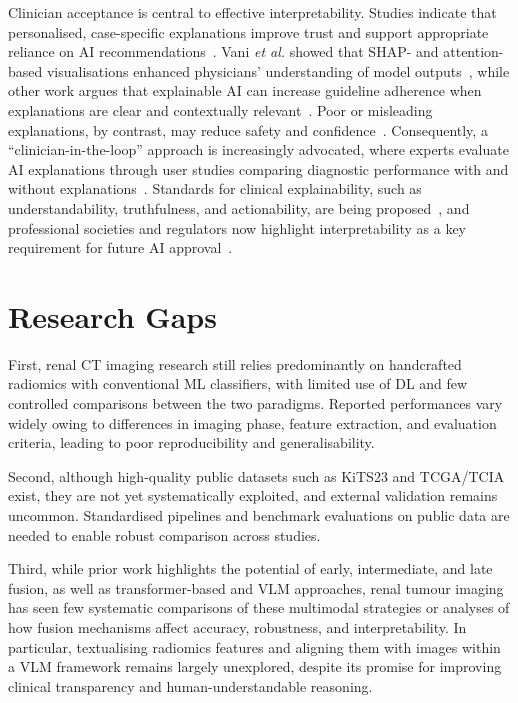 \documentclass[final,british,a4paper,12pt]{phdthesis}
\begin{document}
Clinician acceptance is central to effective interpretability. Studies indicate that personalised, case-specific explanations improve trust and support appropriate reliance on AI recommendations~\cite{vani2025personalized}. Vani \textit{et al.} showed that SHAP- and attention-based visualisations enhanced physicians’ understanding of model outputs~\cite{vani2025personalized}, while other work argues that explainable AI can increase guideline adherence when explanations are clear and contextually relevant~\cite{abgrall2024should,houssein2025explainable}. Poor or misleading explanations, by contrast, may reduce safety and confidence~\cite{abgrall2024should,napravnik2025lessons}. Consequently, a “clinician-in-the-loop” approach is increasingly advocated, where experts evaluate AI explanations through user studies comparing diagnostic performance with and without explanations~\cite{napravnik2025lessons,vani2025personalized}. Standards for clinical explainability, such as understandability, truthfulness, and actionability, are being proposed~\cite{pahud2024orchestrating,jin2023guidelines}, and professional societies and regulators now highlight interpretability as a key requirement for future AI approval~\cite{abgrall2024should,houssein2025explainable}.





\section{Research Gaps}

First, renal CT imaging research still relies predominantly on handcrafted radiomics with conventional ML classifiers, with limited use of DL and few controlled comparisons between the two paradigms. Reported performances vary widely owing to differences in imaging phase, feature extraction, and evaluation criteria, leading to poor reproducibility and generalisability.

Second, although high-quality public datasets such as KiTS23 and TCGA/TCIA exist, they are not yet systematically exploited, and external validation remains uncommon. Standardised pipelines and benchmark evaluations on public data are needed to enable robust comparison across studies.

Third, while prior work highlights the potential of early, intermediate, and late fusion, as well as transformer-based and VLM approaches, renal tumour imaging has seen few systematic comparisons of these multimodal strategies or analyses of how fusion mechanisms affect accuracy, robustness, and interpretability. In particular, textualising radiomics features and aligning them with images within a VLM framework remains largely unexplored, despite its promise for improving clinical transparency and human-understandable reasoning.
\end{document}

